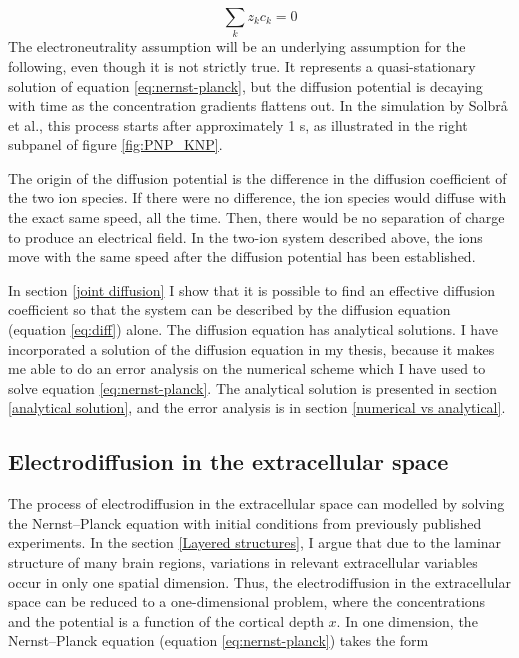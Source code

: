 \documentclass{article}
\begin{document}
$$\sum _k z_k c_k =0$$
The electroneutrality assumption will be an underlying assumption for the following, even though it is not strictly true. It represents a quasi-stationary solution of equation \ref{eq:nernst-planck}, but the diffusion potential is decaying with time as the concentration gradients flattens out. In the simulation by Solbr{\aa} et al., this process starts after approximately 1 s, as illustrated in the right subpanel of figure \ref{fig:PNP_KNP}. 



The origin of the diffusion potential is the difference in the diffusion coefficient of the two ion species. If there were no difference, the ion species would diffuse with the exact same speed, all the time. Then, there would be no separation of charge to produce an electrical field. In the two-ion system described above, the ions move with the same speed after the diffusion potential has been established. 

In section \ref{joint diffusion} I show that  it is possible to find an effective diffusion coefficient so that the system can be described by the diffusion equation (equation  \ref{eq:diff}) alone. 
The diffusion equation has analytical solutions. I have incorporated a solution of the diffusion equation in my thesis, because it makes me able to do an error analysis on the numerical scheme which I have used to solve equation \ref{eq:nernst-planck}. The analytical solution is presented in section \ref{analytical solution}, and the error analysis is in section \ref{numerical vs analytical}.


\subsection{Electrodiffusion in the extracellular space}\label{el.diff in ES}


The process of electrodiffusion in the extracellular space can modelled by solving the Nernst--Planck equation with initial conditions from previously published experiments. In the section \ref{Layered structures}, I argue that due to the laminar structure of many brain regions, variations in relevant extracellular variables occur in only one spatial dimension. Thus, the electrodiffusion in the extracellular space can be reduced to a one-dimensional problem, where the concentrations and the potential is a function of the cortical depth $x$. In one dimension, the Nernst--Planck equation (equation \ref{eq:nernst-planck}) takes the form 
\end{document}
